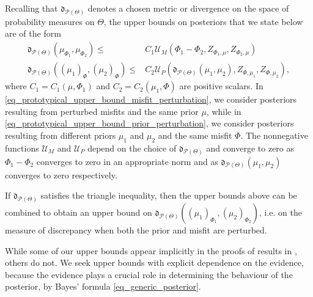 \documentclass[a4paper]{scrartcl}
\theoremstyle{definition}
\numberwithin{equation}{section}
\begin{document}
Recalling that $\mathfrak{d}_{\mathcal{P}(\Theta)}$ denotes a chosen metric or divergence on the space of probability measures on $\Theta$, the upper bounds on posteriors that we state below are of the form
\begin{subequations}
\label{eq_prototypical_upper_bounds}
\begin{align}
  \mathfrak{d}_{\mathcal{P}(\Theta)}(\mu_{\Phi_1},\mu_{\Phi_2})\leq &C_1 \mathcal{U}_M(\Phi_1-\Phi_2,Z_{\Phi_1,\mu},Z_{\Phi_2,\mu})
 \label{eq_prototypical_upper_bound_misfit_perturbation}
 \\
  \mathfrak{d}_{\mathcal{P}(\Theta)}((\mu_1)_{\Phi},(\mu_2)_{\Phi})\leq & C_2 \mathcal{U}_P(\mathfrak{d}_{\mathcal{P}(\Theta)}(\mu_1,\mu_2),Z_{\Phi,\mu_1},Z_{\Phi,\mu_2}),
  \label{eq_prototypical_upper_bound_prior_perturbation}
\end{align}
\end{subequations}
where $C_1=C_1(\mu,\Phi_1)$ and $C_2=C_2(\mu_1,\Phi)$ are positive scalars.
In \eqref{eq_prototypical_upper_bound_misfit_perturbation}, we consider posteriors resulting from perturbed misfits and the same prior $\mu$, while in \eqref{eq_prototypical_upper_bound_prior_perturbation}, we consider posteriors resulting from different priors $\mu_1$ and $\mu_2$ and the same misfit $\Phi$.
The nonnegative functions $\mathcal{U}_M$ and $\mathcal{U}_P$ depend on the choice of $\mathfrak{d}_{\mathcal{P}(\Theta)}$ and converge to zero as $\Phi_1-\Phi_2$ converges to zero in an appropriate norm and as $\mathfrak{d}_{\mathcal{P}(\Theta)}(\mu_1,\mu_2)$ converges to zero respectively.

If $\mathfrak{d}_{\mathcal{P}(\Theta)}$ satisfies the triangle inequality, then the upper bounds above can be combined to obtain an upper bound on $\mathfrak{d}_{\mathcal{P}(\Theta)}((\mu_1)_{\Phi_1},(\mu_2)_{\Phi_2})$, i.e. on the measure of discrepancy when both the prior and misfit are perturbed.

While some of our upper bounds appear implicitly in the proofs of results in \cite{Sprungk2020}, others do not.
We seek upper bounds with explicit dependence on the evidence, because the evidence plays a crucial role in determining the behaviour of the posterior, by Bayes' formula \eqref{eq_generic_posterior}.
\end{document}
